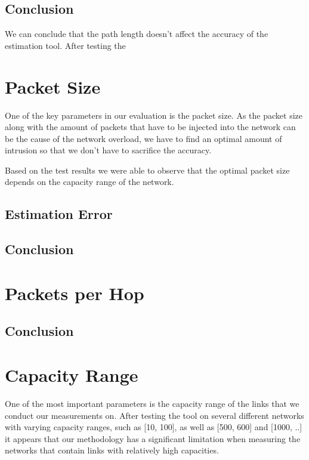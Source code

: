 \subsection*{Conclusion}
We can conclude that the path length doesn't affect the accuracy of the estimation tool. After testing the 

\section{Packet Size}
One of the key parameters in our evaluation is the packet size. 
As the packet size along with the amount of packets that have to be injected into the network can be the cause of the network overload, we have to find an optimal amount of intrusion so that we don't have to sacrifice the accuracy. 

Based on the test results we were able to observe that the optimal packet size depends on the capacity range of the network. 

\subsection*{Estimation Error}

\subsection*{Conclusion}


\section{Packets per Hop}

\subsection*{Conclusion}


\section{Capacity Range}
One of the most important parameters is the capacity range of the links that we conduct our measurements on. After testing the tool on several different networks with varying capacity ranges, such as [10, 100], as well as [500, 600] and [1000, ..] it appears that our methodology has a significant limitation when measuring the networks that contain links with relatively high capacities. 

